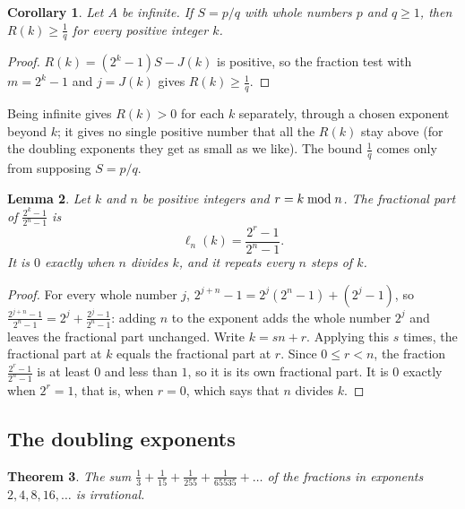 \documentclass[10pt]{article}
\theoremstyle{plain}
\newtheorem{theorem}{Theorem}
\newtheorem{lemma}[theorem]{Lemma}
\newtheorem{corollary}[theorem]{Corollary}
\theoremstyle{definition}
\theoremstyle{remark}
\newcommand{\lft}{\ell}
\newcommand{\rmod}{\mskip5mu\mathrm{mod}\mskip5mu}
\begin{document}
\begin{corollary}\label{cor:atleast}
Let $A$ be infinite. If $S=p/q$ with whole numbers $p$ and $q\ge1$, then
$R(k)\ge\tfrac1q$ for every positive integer $k$.
\end{corollary}

\begin{proof}
$R(k)=(2^k-1)S-J(k)$ is positive, so the fraction test with $m=2^k-1$ and
$j=J(k)$ gives $R(k)\ge\tfrac1q$.
\end{proof}

Being infinite gives $R(k)>0$ for each $k$ separately, through a chosen
exponent beyond $k$; it gives no single positive number that all the $R(k)$
stay above (for the doubling exponents they get as small as we like). The
bound $\tfrac1q$ comes only from supposing $S=p/q$.

\begin{lemma}\label{lem:fracpart}
Let $k$ and $n$ be positive integers and $r=k\rmod n$. The fractional part of
$\tfrac{2^k-1}{2^n-1}$ is
\[
 \lft_n(k)=\frac{2^r-1}{2^n-1}.
\]
It is $0$ exactly when $n$ divides $k$, and it repeats every $n$ steps of $k$.
\end{lemma}

\begin{proof}
For every whole number $j$, $2^{j+n}-1=2^j(2^n-1)+(2^j-1)$, so
$\tfrac{2^{j+n}-1}{2^n-1}=2^j+\tfrac{2^j-1}{2^n-1}$: adding $n$ to the exponent
adds the whole number $2^j$ and leaves the fractional part unchanged. Write $k=sn+r$.
Applying this $s$ times, the fractional part at $k$ equals the fractional part at $r$. Since
$0\le r<n$, the fraction $\tfrac{2^r-1}{2^n-1}$ is at least $0$ and less than
$1$, so it is its own fractional part. It is $0$ exactly when $2^r=1$, that is, when
$r=0$, which says that $n$ divides $k$.
\end{proof}

\subsection{The doubling exponents}\label{app:doubling}

\begin{theorem}\label{thm:doubling}
The sum $\tfrac13+\tfrac1{15}+\tfrac1{255}+\tfrac1{65535}+\dots$ of the
fractions in exponents $2,4,8,16,\dots$ is irrational.
\end{theorem}
\end{document}

